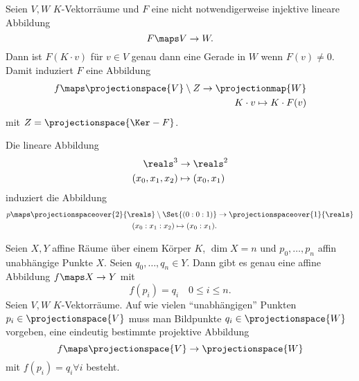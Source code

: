 \begin{bemerkung*}
  Seien \( V,W \) \( K \)-Vektorräume und \( F \) eine nicht notwendigerweise injektive lineare Abbildung
  \begin{equation*}
    F\maps V\to W.
  \end{equation*}
  Dann ist \( F(K\cdot v) \) für \( v\in V \) genau dann eine Gerade in \( W \) wenn \( F(v)\neq 0 \). Damit induziert \( F \) eine Abbildung
  \begin{equation*}
    \begin{split}
      f\maps \projectionspace{V}\setminus Z\to \projectionmap{W}\\
      K\cdot v\mapsto K\cdot F(v)
    \end{split}
  \end{equation*}
  mit \( Z=\projectionspace{\Ker-{F}} \).
\end{bemerkung*}
\begin{beispiel*}
  Die lineare Abbildung 
  \begin{equation*}
    \begin{split}
      \reals^3&\to \reals^2\\
      (x_0,x_1,x_2)&\mapsto (x_0,x_1)
    \end{split}
  \end{equation*}
  induziert die Abbildung
  \begin{equation*}
    \begin{split}
      p\maps \projectionspaceover{2}{\reals}\setminus\Set{(0:0:1)}&\to \projectionspaceover{1}{\reals}\\
      (x_0:x_1:x_2)\mapsto (x_0:x_1).
    \end{split}
  \end{equation*}
  \begin{erinnerung*}
    Seien \( X,Y \) affine Räume über einem Körper \( K \), \( \dim{X}=n \) und \( p_0,\dotsc,p_n \) affin unabhängige Punkte \( X \). Seien \( q_0,\dotsc,q_n\in Y \). Dann gibt es genau eine affine Abbildung \( f\maps X\to Y \) mit
    \begin{equation*}
      f(p_i)=q_i\quad 0\leq i\leq n.
    \end{equation*}
    Seien \( V,W \) \( K \)-Vektorräume. Auf wie vielen \enquote{unabhängigen} Punkten \( p_i\in \projectionspace{V} \) muss man Bildpunkte \( q_i\in \projectionspace{W} \) vorgeben, \sd eine eindeutig bestimmte projektive Abbildung
    \begin{equation*}
      f\maps \projectionspace{V}\to \projectionspace{W}
    \end{equation*}
    mit \( f(p_i)=q_i \forall i\) besteht.
  \end{erinnerung*}
\end{beispiel*}
